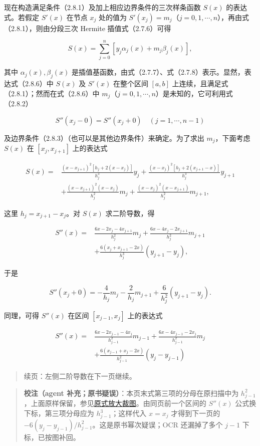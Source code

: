 \documentclass[
  10pt,
  fontset=fandol]{ctexart}
\begin{document}
现在构造满足条件（2.8.1）及加上相应边界条件的三次样条函数 \(S(x)\) 的表达式。若假定 \(S'(x)\) 在节点 \(x_j\) 处的值为 \(S'(x_j)=m_j\)（\(j=0,1,\cdots,n\)），再由式（2.8.1），则由分段三次 Hermite 插值式（2.7.6）可得

\[S(x)=\sum_{j=0}^n[y_j\alpha_j(x)+m_j\beta_j(x)],\tag{2.8.6}\]

其中 \(\alpha_j(x),\beta_j(x)\) 是插值基函数，由式（2.7.7）、式（2.7.8）表示。显然，表达式（2.8.6）中 \(S(x)\) 及 \(S'(x)\) 在整个区间 \([a,b]\) 上连续，且满足式（2.8.1）；然而在式（2.8.6）中 \(m_j\)（\(j=0,1,\cdots,n\)）是未知的，它可利用式（2.8.2）

\[S''(x_j-0)=S''(x_j+0)\quad(j=1,\cdots,n-1)\]

及边界条件（2.8.3）（也可以是其他边界条件）来确定。为了求出 \(m_j\)，下面考虑 \(S(x)\) 在 \([x_j,x_{j+1}]\) 上的表达式

\[\begin{aligned}
S(x)={}&\frac{(x-x_{j+1})^2[h_j+2(x-x_j)]}{h_j^3}y_j+\frac{(x-x_j)^2[h_j+2(x_{j+1}-x)]}{h_j^3}y_{j+1}\\
&+\frac{(x-x_{j+1})^2(x-x_j)}{h_j^2}m_j+\frac{(x-x_j)^2(x-x_{j+1})}{h_j^2}m_{j+1},
\end{aligned}\tag{2.8.7}\]

这里 \(h_j=x_{j+1}-x_j\)。对 \(S(x)\) 求二阶导数，得

\[\begin{aligned}
S''(x)={}&\frac{6x-2x_j-4x_{j+1}}{h_j^2}m_j+\frac{6x-4x_j-2x_{j+1}}{h_j^2}m_{j+1}\\
&+\frac{6(x_j+x_{j+1}-2x)}{h_j^3}(y_{j+1}-y_j),
\end{aligned}\]

于是

\[S''(x_j+0)=-\frac4{h_j}m_j-\frac2{h_j}m_{j+1}+\frac6{h_j^2}(y_{j+1}-y_j).\]

同理，可得 \(S''(x)\) 在区间 \([x_{j-1},x_j]\) 上的表达式

\[\begin{aligned}
S''(x)={}&\frac{6x-2x_{j-1}-4x_j}{h_{j-1}^2}m_{j-1}+\frac{6x-4x_{j-1}-2x_j}{h_{j-1}^2}m_j\\
&+\frac{6(x_{j-1}+x_j-2x)}{h_{j-1}^2}(y_j-y_{j-1})
\end{aligned}\]

\begin{quote}
续页：左侧二阶导数在下一页继续。
\end{quote}

\begin{quote}
\textbf{校注（agent 补充；原书疑误）}：本页末式第三项的分母在原扫描中为 \(h_{j-1}^2\)，上面原样保留，参见\href{../assets/ch02b/pdf-050-second-derivative-detail.png}{原式放大裁图}。由同页前一个区间的 \(S''(x)\) 公式换下标，第三项分母应为 \(h_{j-1}^3\)；这样代入 \(x=x_j\) 才得到下一页的 \(-6(y_j-y_{j-1})/h_{j-1}^2\)。这是原书幂次疑误；OCR 还漏掉了多个 \(j-1\) 下标，已按图补回。
\end{quote}
\end{document}
